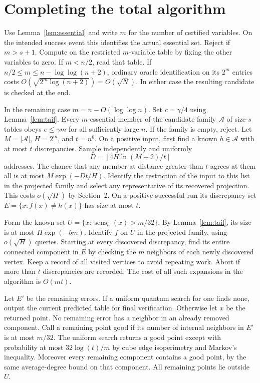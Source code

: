 \documentclass[11pt]{article}
\newcommand{\sen}{\operatorname{sens}}
\begin{document}
\section{Completing the total algorithm}
Use Lemma~\ref{lem:essential} and write $m$ for the number of certified variables. On the intended success event this identifies the actual essential set. Reject if $m>s+1$. Compute on the restricted $m$-variable table by fixing the other variables to zero. If $m<n/2$, read that table. If $n/2\le m\le n-\log\log(n+2)$, ordinary oracle identification on its $2^m$ entries costs $O(\sqrt{2^m\log(n+2)})=O(\sqrt N)$. In either case the resulting candidate is checked at the end.

In the remaining case $m=n-O(\log\log n)$. Set $c=\gamma/4$ using Lemma~\ref{lem:tail}. Every $m$-essential member of the candidate family $\mathcal A$ of size-$s$ tables obeys $e\le\gamma m$ for all sufficiently large $n$. If the family is empty, reject. Let $M=|\mathcal A|$, $H=2^m$, and $t=n^6$. On a positive input, first find a known $h\in\mathcal A$ with at most $t$ discrepancies. Sample independently and uniformly
\[
       D=\left\lceil 4H\ln(M+2)/t\right\rceil
\]
addresses. The chance that any member at distance greater than $t$ agrees at them all is at most $M\exp(-Dt/H)$. Identify the restriction of the input to this list in the projected family and select any representative of its recovered projection. This costs $o(\sqrt H)$ by Section~2. On a positive successful run its discrepancy set $E=\{x:f(x)\ne h(x)\}$ has size at most $t$.

Form the known set $U=\{x:\sen_h(x)>m/32\}$. By Lemma~\ref{lem:tail}, its size is at most $H\exp(-bm)$. Identify $f$ on $U$ in the projected family, using $o(\sqrt H)$ queries. Starting at every discovered discrepancy, find its entire connected component in $E$ by checking the $m$ neighbors of each newly discovered vertex. Keep a record of all visited vertices to avoid repeating work. Abort if more than $t$ discrepancies are recorded. The cost of all such expansions in the algorithm is $O(mt)$.

Let $E'$ be the remaining errors. If a uniform quantum search for one finds none, output the current predicted table for final verification. Otherwise let $x$ be the returned point. No remaining error has a neighbor in an already removed component. Call a remaining point good if its number of internal neighbors in $E'$ is at most $m/32$. The uniform search returns a good point except with probability at most $32\log(t)/m$ by cube edge isoperimetry and Markov's inequality. Moreover every remaining component contains a good point, by the same average-degree bound on that component. All remaining points lie outside $U$.
\end{document}
